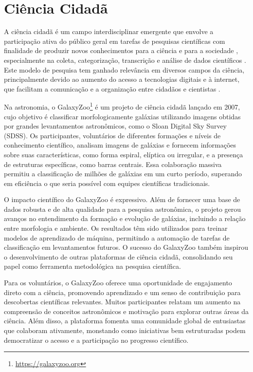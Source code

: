 \section{Ciência Cidadã}
\label{sec:cs}
A ciência cidadã é um campo interdisciplinar emergente que envolve a participação ativa do público geral em tarefas de pesquisas científicas com finalidade de produzir novos conhecimentos para a ciência e para a sociedade \cite{scs-1}, especialmente na coleta, categorização, transcrição e análise de dados científicos \cite{silvertown2009,bonney2014}. Este modelo de pesquisa tem ganhado relevância em diversos campos da ciência, principalmente devido ao aumento do acesso a tecnologias digitais e à internet, que facilitam a comunicação e a organização entre cidadãos e cientistas \cite{scs-4}.

Na astronomia, o GalaxyZoo\footnote{\url{https://galaxyzoo.org}} \cite{gz} é um projeto de ciência cidadã lançado em 2007, cujo objetivo é classificar morfologicamente galáxias utilizando imagens obtidas por grandes levantamentos astronômicos, como o Sloan Digital Sky Survey (SDSS). Os participantes, voluntários de diferentes formações e níveis de conhecimento científico, analisam imagens de galáxias e fornecem informações sobre suas características, como forma espiral, elíptica ou irregular, e a presença de estruturas específicas, como barras centrais. Essa colaboração massiva permitiu a classificação de milhões de galáxias em um curto período, superando em eficiência o que seria possível com equipes científicas tradicionais.

O impacto científico do GalaxyZoo é expressivo. Além de fornecer uma base de dados robusta e de alta qualidade para a pesquisa astronômica, o projeto gerou avanços no entendimento da formação e evolução de galáxias, incluindo a relação entre morfologia e ambiente. Os resultados têm sido utilizados para treinar modelos de aprendizado de máquina, permitindo a automação de tarefas de classificação em levantamentos futuros. O sucesso do GalaxyZoo também inspirou o desenvolvimento de outras plataformas de ciência cidadã, consolidando seu papel como ferramenta metodológica na pesquisa científica.

Para os voluntários, o GalaxyZoo oferece uma oportunidade de engajamento direto com a ciência, promovendo aprendizado e um senso de contribuição para descobertas científicas relevantes. Muitos participantes relatam um aumento na compreensão de conceitos astronômicos e motivação para explorar outras áreas da ciência. Além disso, a plataforma fomenta uma comunidade global de entusiastas que colaboram ativamente, monstando como iniciativas bem estruturadas podem democratizar o acesso e a participação no progresso científico.



